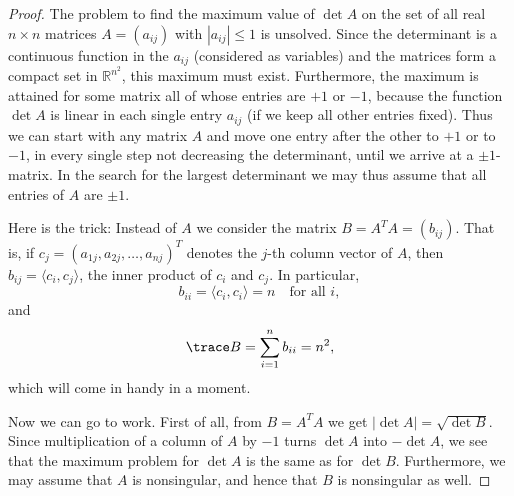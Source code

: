 \begin{proof}
  The problem to find the maximum value of $\det A$ on the set of all real $n \times n$ matrices $A = (a_{ij})$ with $|a_{ij}| \le 1$ is unsolved.
  Since the determinant is a continuous function in the $a_{ij}$ (considered as variables)
  and the matrices form a compact set in $\mathbb{R}^{n^2}$, this maximum must exist.
  Furthermore, the maximum is attained for some matrix all of whose entries are $+1$ or $-1$,
  because the function $\det A$ is linear in each single entry $a_{ij}$ (if we keep all other entries fixed).
  Thus we can start with any matrix $A$ and move one entry after the other to $+1$ or to $-1$,
  in every single step not decreasing the determinant, until we arrive at a $\pm 1$-matrix.
  In the search for the largest determinant we may thus assume that all entries of $A$ are $\pm 1$.

  Here is the trick:
  Instead of $A$ we consider the matrix $B = A^T A = (b_{ij})$.
  That is, if $c_j = (a_{1j}, a_{2j}, \dots, a_{nj})^T$ denotes the $j$-th column vector of $A$,
  then $b_{ij} = \langle c_i, c_j \rangle$, the inner product of $c_i$ and $c_j$.
  In particular,
  \[
  b_{ii} = \langle c_i, c_i \rangle = n \quad \text{for all } i,
  \]
  and
  \begin{equation} \label{eq:trace_B}
  \trace B = \sum_{i=1}^n b_{ii} = n^2,
  \end{equation}
  which will come in handy in a moment.

  Now we can go to work.
  First of all, from $B = A^T A$ we get $|\det A| = \sqrt{\det B}$.
  Since multiplication of a column of $A$ by $-1$ turns $\det A$ into $-\det A$,
  we see that the maximum problem for $\det A$ is the same as for $\det B$.
  Furthermore, we may assume that $A$ is nonsingular, and hence that $B$ is nonsingular as well.


\end{proof}
